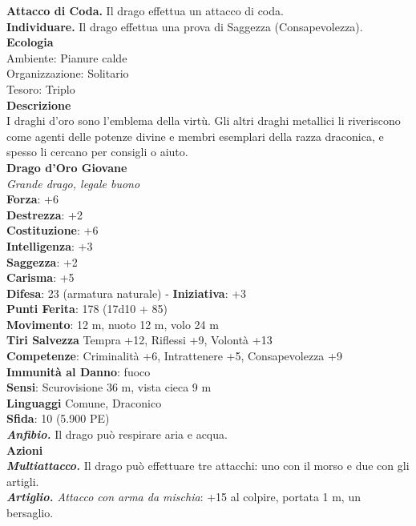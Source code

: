 \begin{multicols}{2}
\textbf{Attacco di Coda.} Il drago effettua un attacco di coda.\\
\textbf{Individuare.} Il drago effettua una prova di Saggezza (Consapevolezza).\\
\textbf{Ecologia}\\
Ambiente: Pianure calde\\
Organizzazione: Solitario\\
Tesoro: Triplo\\
\textbf{Descrizione}\\
I draghi d'oro sono l'emblema della virtù. Gli altri draghi metallici li riveriscono come agenti delle potenze divine e membri esemplari della razza draconica, e spesso li cercano per consigli o aiuto.\\
\medskip\textbf{Drago d'Oro Giovane}\\
\emph{Grande drago, legale buono}\\
\textbf{Forza}: +6\\
\textbf{Destrezza}: +2\\
\textbf{Costituzione}: +6\\
\textbf{Intelligenza}: +3\\
\textbf{Saggezza}: +2\\
\textbf{Carisma}: +5\\
\textbf{Difesa}: 23 (armatura naturale) - \textbf{Iniziativa}: +3\\
\textbf{Punti Ferita}: 178 (17d10 + 85)\\
\textbf{Movimento}: 12 m, nuoto 12 m, volo 24 m\\
\textbf{Tiri Salvezza} Tempra +12, Riflessi +9, Volontà +13\\
\textbf{Competenze}: Criminalità +6, Intrattenere +5, Consapevolezza +9 \\
\textbf{Immunità al Danno}: fuoco\\
\textbf{Sensi}: Scurovisione 36 m, vista cieca 9 m\\
\textbf{Linguaggi} Comune, Draconico\\
\textbf{Sfida}: 10 (5.900 PE)\smallskip\\
\emph{\textbf{Anfibio.}} Il drago può respirare aria e acqua.\\
\smallskip\textbf{Azioni}\\
\emph{\textbf{Multiattacco.}} Il drago può effettuare tre attacchi: uno con il morso e due con gli artigli.\\
\emph{\textbf{Artiglio.} Attacco con arma da mischia}: +15 al colpire, portata 1 m, un bersaglio.\\

\end{multicols}
